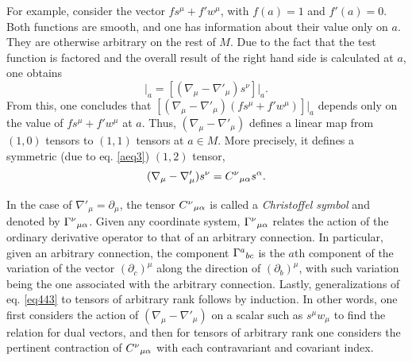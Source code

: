 \documentclass[
12pt,		%
openright,	%
twoside,  %
a4paper,			%
chapter=TITLE,		%
english,			%
french,				%
spanish,			%
brazil				%
]{USPSC-classe/USPSC}
\begin{document}
\begin{apendicesenv}
For example, consider the vector $fs^{\mu}+f'w^{\mu}$, with $f(a)=1$ and $f'(a)=0$. Both functions are smooth, and one has information about their value only on $a$. They are otherwise arbitrary on the rest of $M$. Due to the fact that the test function is factored and the overall result of the right hand side is calculated at $a$, one obtains
\begin{equation}
    [(\nabla_{\mu}-\nabla'_{\mu})(fs^{\nu}+f'w^{\nu})]\big|_a=[(\nabla_{\mu}-\nabla'_{\mu})s^{\nu}]\big|_a.
\end{equation}
From this, one concludes that $[(\nabla_{\mu}-\nabla'_{\mu})(fs^{\mu}+f'w^{\mu})]|_a$ depends only on the value of $fs^{\mu}+f'w^{\mu}$ at $a$. Thus, $(\nabla_{\mu}-\nabla'_{\mu})$ defines a linear map from $(1,0)$ tensors to $(1,1)$ tensors at $a\in M$. More precisely, it defines a symmetric (due to eq. \ref{aeq3}) $(1,2)$ tensor,
\begin{equation}\label{eq443}
(\nabla_{\mu}-\nabla'_{\mu})s^{\nu}=C^{\nu}\mathstrut_{\mu\alpha}s^{\alpha}.
\end{equation}

In the case of $\nabla'_{\mu}=\partial_{\mu}$, the tensor $C^{\nu}\mathstrut_{\mu\alpha}$ is called a \textit{Christoffel symbol} and denoted by $\Gamma^{\nu}\mathstrut_{\mu\alpha}$. Given any coordinate system, $\Gamma^{\nu}\mathstrut_{\mu\alpha}$ relates the action of the ordinary derivative operator to that of an arbitrary connection. In particular, given an arbitrary connection, the component $\Gamma^{a}\mathstrut_{bc}$ is the $a$th component of the variation of the vector $(\partial_c)^{\mu}$ along the direction of $(\partial_b)^{\mu}$, with such variation being the one associated with the arbitrary connection. Lastly, generalizations of eq. \ref{eq443} to tensors of arbitrary rank follows by induction. In other words, one first considers the action of $(\nabla_{\mu}-\nabla'_{\mu})$ on a scalar such as $s^{\mu}w_{\mu}$ to find the relation for dual vectors, and then for tensors of arbitrary rank one considers the pertinent contraction of $C^{\nu}\mathstrut_{\mu\alpha}$ with each contravariant and covariant index.


\end{apendicesenv}
\end{document}
